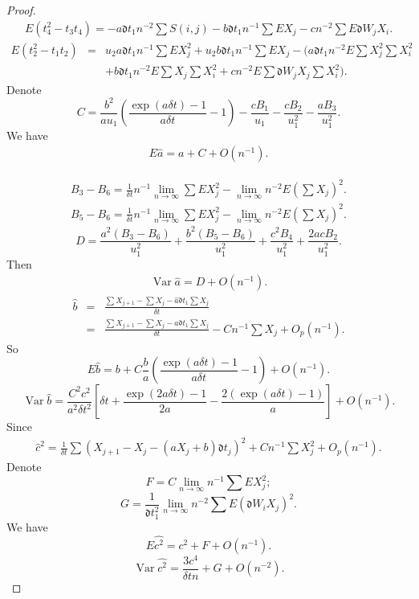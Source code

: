 \documentclass[12pt,reqno, a4paper]{article}
\numberwithin{equation}{section}
\begin{document}
\begin{proof}
    \begin{eqnarray*}
E(t_4^2-t_3t_4)=-a\mathfrak{d} t_1 n^{-2}\sum S(i,j)-b\mathfrak{d} t_1n^{-1}\sum E X_j-cn^{-2}\sum E\mathfrak{d} W_j X_i.
 \end{eqnarray*}
   \begin{eqnarray*}
E(t_2^2-t_1t_2)&=&u_2a\mathfrak{d} t_1n^{-1}\sum EX_j^2+u_2b\mathfrak{d} t_1n^{-1}\sum EX_j -(a\mathfrak{d} t_1n^{-2}E\sum X_j^2\sum X_i^2\\&&+b\mathfrak{d} t_1n^{-2}E\sum X_j \sum X_i^2+cn^{-2}E\sum \mathfrak{d} W_jX_j\sum X_i^2).\end{eqnarray*}
     Denote
  $$C=\frac {b^2}{au_1}(\frac {\exp(a\delta t)-1}{a\delta t}-1)-\frac {cB_1}{u_1}-\frac {cB_2}{u_1^2}-\frac {aB_3}{u_1^2}.$$
 We have
  \begin{eqnarray}E\hat{a}=a+C+O(n^{-1}).\end{eqnarray}

\begin{eqnarray*}
    B_3-B_6=\frac 1 {\delta t} n^{-1}\lim_{n\to \infty}\sum EX_j^2-\lim_{n\to \infty}n^{-2}E(\sum X_{j})^2.
\end{eqnarray*}
\begin{eqnarray*}
    B_5-B_6=\frac 1 {\delta t} n^{-1}\lim_{n\to \infty}\sum EX_j^2-\lim_{n\to \infty}n^{-2}E(\sum X_{j})^2.
\end{eqnarray*}
$$D=\frac {a^2(B_3-B_6)}{u_1^2}+\frac {b^2(B_5-B_6)}{u_1^2}+\frac {c^2B_4}{u_1^2}+\frac {2acB_2}{u_1^2}.$$
Then
 \begin{eqnarray}\operatorname{Var}\hat{a}= {D}+O(n^{-1}).\end{eqnarray}
 \begin{eqnarray*}\hat{b}&=&\frac {\sum X_{j+1}-\sum X_{j}-\hat{a}\mathfrak{d} t_1\sum X_j}{\delta t}\\&=&\frac {\sum X_{j+1}-\sum X_{j}-{a}\mathfrak{d} t_1\sum X_j}{\delta t}- {Cn^{-1}\sum X_j}+O_p(n^{-1}).\end{eqnarray*}
 So
  $$E\hat{b}=b+C\frac b a( \frac {\exp(a\delta t)-1}{a\delta t}-1)+O(n^{-1}).$$
  $$\operatorname{Var}\hat{b}=\frac {C^2c^2}{a^2\delta t^2 }[\delta t+\frac {\exp(2a \delta t)-1}{2a}-\frac {2(\exp(a \delta t)-1)}{a}]+O(n^{-1}).$$
 Since   \begin{eqnarray*}\hat{c}^2=\frac 1 {\delta t} \sum{(X_{j+1}-X_{j}-({a}X_{j}+{b})\mathfrak{d}  t_{j})^2}+Cn^{-1}\sum X_{j}^2+O_p(n^{-1}). \end{eqnarray*}
 Denote $$F=C\lim_{n\to \infty}n^{-1}\sum EX_{j}^2;$$
  $$G=\frac 1 {\mathfrak{d} t_1^2}\lim_{n\to \infty} n^{-2}\sum E(\mathfrak{d} W_iX_j)^2.$$
We have
  $$E\hat{c^2}=c^2+F+O(n^{-1}).$$
  $$\operatorname{Var}\hat{c^2}=\frac {3c^4}{\delta t n}+G+O(n^{-2}).$$
  \end{proof}
\end{document}
